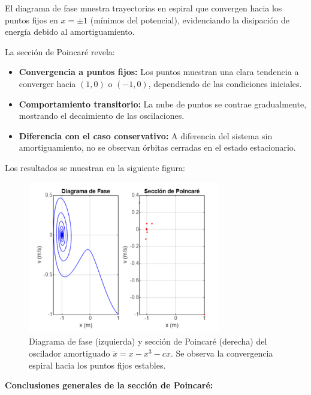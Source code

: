 \documentclass[a4paper,12pt]{article}
\theoremstyle{mytheor}
\begin{document}
El diagrama de fase muestra trayectorias en espiral que convergen hacia los puntos fijos en $x = \pm 1$ (mínimos del potencial), evidenciando la disipación de energía debido al amortiguamiento.

La sección de Poincaré revela:

\begin{itemize}
    \item \textbf{Convergencia a puntos fijos:} Los puntos muestran una clara tendencia a converger hacia $(1,0)$ o $(-1,0)$, dependiendo de las condiciones iniciales.
    
    \item \textbf{Comportamiento transitorio:} La nube de puntos se contrae gradualmente, mostrando el decaimiento de las oscilaciones.
    
    \item \textbf{Diferencia con el caso conservativo:} A diferencia del sistema sin amortiguamiento, no se observan órbitas cerradas en el estado estacionario.
\end{itemize}


Los resultados se muestran en la siguiente figura:

\begin{figure}[H]
    \centering
    \includegraphics[width=0.75\textwidth]{g10.png}
    \caption{Diagrama de fase (izquierda) y sección de Poincaré (derecha) del oscilador amortiguado $\ddot{x} = x - x^3 - c\dot{x}$. Se observa la convergencia espiral hacia los puntos fijos estables.}
    \label{fig:seccion_poincare_oscilador_amortiguado} 
\end{figure}

\vspace{0.5cm}

\textbf{Conclusiones generales de la sección de Poincaré:}
\end{document}
